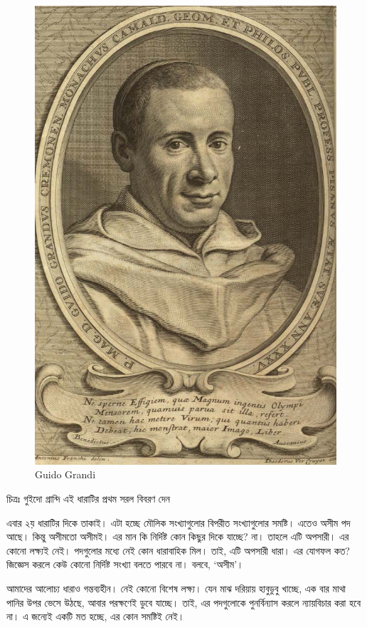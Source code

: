 \documentclass[
]{book}
\begin{document}
\begin{figure}

{\centering \includegraphics[width=0.8\linewidth]{img/grandi} 

}

\caption{Guido Grandi}\label{fig:grandi}
\end{figure}

চিত্রঃ গুইদো গ্রান্দি এই ধারাটির প্রথম সরল বিবরণ দেন

এবার ২য় ধারাটির দিকে তাকাই। এটা হচ্ছে মৌলিক সংখ্যাগুলোর বিপরীত সংখ্যাগুলোর সমষ্টি। এতেও অসীম পদ আছে। কিন্তু অসীমতো অসীমই। এর মান কি নির্দিষ্ট কোন কিছুর দিকে যাচ্ছে? না। তাহলে এটি অপসারী। এর কোনো লক্ষ্যই নেই। পদগুলোর মধ্যে নেই কোন ধারাবাহিক মিল। তাই, এটি অপসারী ধারা। এর যোগফল কত? জিজ্ঞেস করলে কেউ কোনো নির্দিষ্ট সংখ্যা বলতে পারবে না। বলবে, `অসীম'।

আমাদের আলোচ্য ধারাও গন্তব্যহীন। নেই কোনো বিশেষ লক্ষ্য। যেন মাঝ দরিয়ায় হাবুডুবু খাচ্ছে, এক বার মাথা পানির উপর ভেসে উঠছে, আবার পরক্ষণেই ডুবে যাচ্ছে। তাই, এর পদগুলোকে পুনর্বিন্যাস করলে ন্যায়বিচার করা হবে না। এ জন্যেই একটি মত হচ্ছে, এর কোন সমষ্টিই নেই।
\end{document}
